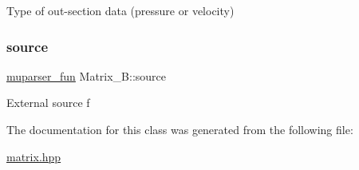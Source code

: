 Type of out-\/section data (pressure or velocity) \mbox{\label{classMatrix__B_ad2925cbb0e6aed0a6795e85af422a62f}} 
\subsubsection{\texorpdfstring{source}{source}}
{\footnotesize\ttfamily \hyperlink{classmuparser__fun}{muparser\+\_\+fun} Matrix\+\_\+\+B\+::source\hspace{0.3cm}{\ttfamily [private]}}

External source f 

The documentation for this class was generated from the following file\+:\begin{DoxyCompactItemize}
\item 
\hyperlink{matrix_8hpp}{matrix.\+hpp}\end{DoxyCompactItemize}
